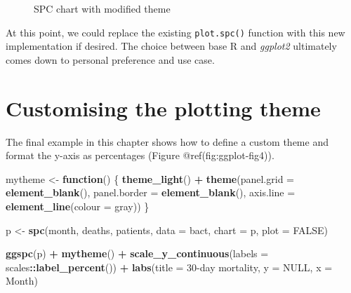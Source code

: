 \documentclass[
]{book}
\makeatletter
\newenvironment{Shaded}{\begin{snugshade}}{\end{snugshade}}
\newcommand{\AttributeTok}[1]{\textcolor[rgb]{0.13,0.29,0.53}{#1}}
\newcommand{\ConstantTok}[1]{\textcolor[rgb]{0.56,0.35,0.01}{#1}}
\newcommand{\ControlFlowTok}[1]{\textcolor[rgb]{0.13,0.29,0.53}{\textbf{#1}}}
\newcommand{\FunctionTok}[1]{\textcolor[rgb]{0.13,0.29,0.53}{\textbf{#1}}}
\newcommand{\NormalTok}[1]{#1}
\newcommand{\OtherTok}[1]{\textcolor[rgb]{0.56,0.35,0.01}{#1}}
\newcommand{\SpecialCharTok}[1]{\textcolor[rgb]{0.81,0.36,0.00}{\textbf{#1}}}
\newcommand{\StringTok}[1]{\textcolor[rgb]{0.31,0.60,0.02}{#1}}
\newcommand*\pandocbounded[1]{%
  \sbox\pandoc@box{#1}%
  \Gscale@div\@tempa{\textheight}{\dimexpr\ht\pandoc@box+\dp\pandoc@box\relax}%
  \Gscale@div\@tempb{\linewidth}{\wd\pandoc@box}%
  \ifdim\@tempb\p@<\@tempa\p@\let\@tempa\@tempb\fi%
  \ifdim\@tempa\p@<\p@\scalebox{\@tempa}{\usebox\pandoc@box}%
  \else\usebox{\pandoc@box}%
  \fi%
}
\makeatother
\begin{document}
\begin{figure}
\centering
\pandocbounded{}
\caption{SPC chart with modified theme}
\end{figure}

At this point, we could replace the existing \texttt{plot.spc()}
function with this new implementation if desired. The choice between
base R and \emph{ggplot2} ultimately comes down to personal preference
and use case.

\section{Customising the plotting
theme}\label{customising-the-plotting-theme}

The final example in this chapter shows how to define a custom theme and
format the y-axis as percentages (Figure @ref(fig:ggplot-fig4)).

\begin{Shaded}
\begin{Highlighting}[]
\NormalTok{mytheme }\OtherTok{\textless{}{-}} \ControlFlowTok{function}\NormalTok{() \{}
  \FunctionTok{theme\_light}\NormalTok{() }\SpecialCharTok{+}
  \FunctionTok{theme}\NormalTok{(}\AttributeTok{panel.grid   =} \FunctionTok{element\_blank}\NormalTok{(),}
        \AttributeTok{panel.border =} \FunctionTok{element\_blank}\NormalTok{(),}
        \AttributeTok{axis.line    =} \FunctionTok{element\_line}\NormalTok{(}\AttributeTok{colour =} \StringTok{\textquotesingle{}gray\textquotesingle{}}\NormalTok{))}
\NormalTok{\}}

\NormalTok{p }\OtherTok{\textless{}{-}} \FunctionTok{spc}\NormalTok{(month, deaths, patients,}
          \AttributeTok{data =}\NormalTok{ bact,}
          \AttributeTok{chart =} \StringTok{\textquotesingle{}p\textquotesingle{}}\NormalTok{,}
          \AttributeTok{plot =} \ConstantTok{FALSE}\NormalTok{)}

\FunctionTok{ggspc}\NormalTok{(p) }\SpecialCharTok{+}
  \FunctionTok{mytheme}\NormalTok{() }\SpecialCharTok{+}
  \FunctionTok{scale\_y\_continuous}\NormalTok{(}\AttributeTok{labels =}\NormalTok{ scales}\SpecialCharTok{::}\FunctionTok{label\_percent}\NormalTok{()) }\SpecialCharTok{+}
  \FunctionTok{labs}\NormalTok{(}\AttributeTok{title =} \StringTok{\textquotesingle{}30{-}day mortality\textquotesingle{}}\NormalTok{,}
       \AttributeTok{y     =} \ConstantTok{NULL}\NormalTok{,}
       \AttributeTok{x     =} \StringTok{\textquotesingle{}Month\textquotesingle{}}\NormalTok{)}
\end{Highlighting}
\end{Shaded}
\end{document}
